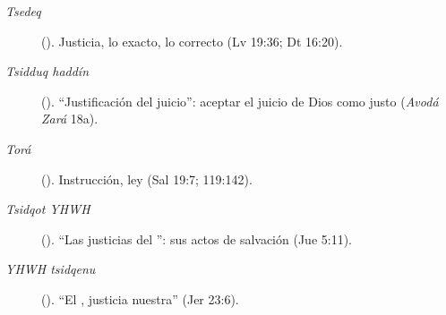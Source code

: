 \begin{description}
\item[\emph{Tsedeq}] (). Justicia, lo exacto, lo correcto (Lv 19:36; Dt 16:20).
\item[\emph{Tsidduq haddín}] (). ``Justificación del juicio'': aceptar el juicio de Dios como justo (\emph{Avodá Zará} 18a).
\item[\emph{Torá}] (). Instrucción, ley (Sal 19:7; 119:142).
\item[\emph{Tsidqot YHWH}] (). ``Las justicias del \SENOR'': sus actos de salvación (Jue 5:11).
\item[\emph{YHWH tsidqenu}] (). ``El \SENOR, justicia nuestra'' (Jer 23:6).
\end{description}

